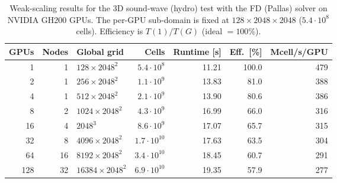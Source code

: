 \begin{table}
    \centering
    \caption{Weak-scaling results for the 3D sound-wave (hydro) test with
    the FD (Pallas) solver on NVIDIA GH200 GPUs.  The per-GPU sub-domain
    is fixed at $128\times2048\times2048$ ($5.4\cdot10^{8}$ cells).
    Efficiency is $T(1)/T(G)$ (ideal $=100\%$).}
    \label{tab:weak_scaling_hydro}
    \begin{tabular}{rrlrrrr}
        \toprule
        GPUs & Nodes & Global grid & Cells & Runtime [s] & Eff.\ [\%] & Mcell/s/GPU \\
        \midrule
        1 & 1 & $128\times2048^{2}$ & $5.4\cdot10^{8}$ & 11.21 & 100.0 & 479 \\
        2 & 1 & $256\times2048^{2}$ & $1.1\cdot10^{9}$ & 13.83 & 81.0 & 388 \\
        4 & 1 & $512\times2048^{2}$ & $2.1\cdot10^{9}$ & 13.90 & 80.6 & 386 \\
        8 & 2 & $1024\times2048^{2}$ & $4.3\cdot10^{9}$ & 16.99 & 66.0 & 316 \\
        16 & 4 & $2048^{3}$ & $8.6\cdot10^{9}$ & 17.07 & 65.7 & 315 \\
        32 & 8 & $4096\times2048^{2}$ & $1.7\cdot10^{10}$ & 17.63 & 63.5 & 304 \\
        64 & 16 & $8192\times2048^{2}$ & $3.4\cdot10^{10}$ & 18.45 & 60.7 & 291 \\
        128 & 32 & $16384\times2048^{2}$ & $6.9\cdot10^{10}$ & 19.35 & 57.9 & 277 \\
        \bottomrule
    \end{tabular}
\end{table}

